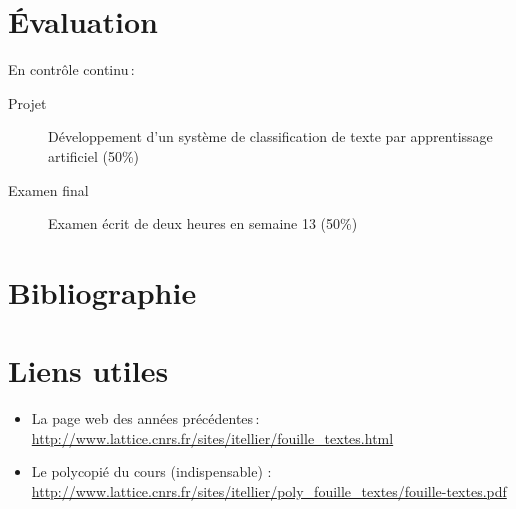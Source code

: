 \documentclass[a4, 11pt]{article}
\begin{document}
\section*{Évaluation}
En contrôle continu :

\begin{description}
    \item[Projet] Développement d'un système de classification de texte par apprentissage artificiel (50\%)
    \item[Examen final] Examen écrit de deux heures en semaine 13 (50\%)
\end{description}

\section*{Bibliographie}
\printbibliography[heading=none]

\section*{Liens utiles}
\begin{itemize}
    \item La page web des années précédentes : \url{http://www.lattice.cnrs.fr/sites/itellier/fouille_textes.html}
    \item Le polycopié du cours (indispensable) :  \url{http://www.lattice.cnrs.fr/sites/itellier/poly_fouille_textes/fouille-textes.pdf}
\end{itemize}
\end{document}
